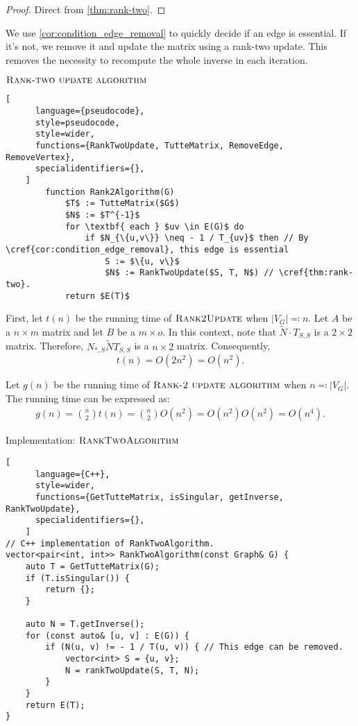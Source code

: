 \begin{proof}
    Direct from \cref{thm:rank-two}. 
\end{proof}

We use \cref{cor:condition_edge_removal} to quickly decide if an edge is essential. 
If it's not, we remove it and update the matrix using a rank-two update. 
This removes the necessity to recompute the whole inverse in each iteration.

\begin{programruledcaption}{\(\textsc{Rank-two update algorithm}\)}
    \begin{lstlisting}[
      language={pseudocode},
      style=pseudocode,
      style=wider,
      functions={RankTwoUpdate, TutteMatrix, RemoveEdge, RemoveVertex},
      specialidentifiers={},
    ]
        function Rank2Algorithm(G)
            $T$ := TutteMatrix($G$)
            $N$ := $T^{-1}$
            for \textbf{ each } $uv \in E(G)$ do
                if $N_{\{u,v\}} \neq - 1 / T_{uv}$ then // By \cref{cor:condition_edge_removal}, this edge is essential
                    S := $\{u, v\}$
                    $N$ := RankTwoUpdate($S, T, N$) // \cref{thm:rank-two}.
            return $E(T)$
    \end{lstlisting}
\end{programruledcaption}

First, let \(t(n)\) be the running time of \(\textsc{Rank2Update}\) when \(|V_G| \eqcolon n\).
Let \(A\) be a \(n \times m\) matrix and let \(B\) be a \(m \times o\).
In this context, note that \(\tilde{N} \cdot T_{S, S}\) is a \(2 \times 2\) matrix.
Therefore, \(N_{*, S}\tilde{N}T_{S, S}\) is a \(n \times 2\) matrix.
Consequently,
\[
    t(n) = O(2n^2) = O(n^2).
\]

Let \(g(n)\) be the running time of \(\textsc{Rank-2 update algorithm}\) when \(n \eqcolon |V_G|\).
The running time can be expressed as:
\begin{align*}
    g(n) = \binom{n}{2} t(n) = \binom{n}{2} O(n^2) = O(n^2) O(n^2) = O(n^4).
\end{align*}

\begin{programruledcaption}{Implementation: \(\textsc{RankTwoAlgorithm}\)}
    \begin{lstlisting}[
      language={C++},
      style=wider,
      functions={GetTutteMatrix, isSingular, getInverse, RankTwoUpdate},
      specialidentifiers={},
    ]
// C++ implementation of RankTwoAlgorithm.
vector<pair<int, int>> RankTwoAlgorithm(const Graph& G) {
    auto T = GetTutteMatrix(G);
    if (T.isSingular()) {
        return {};
    } 

    auto N = T.getInverse();
    for (const auto& [u, v] : E(G)) {
        if (N(u, v) != - 1 / T(u, v)) { // This edge can be removed.
            vector<int> S = {u, v};
            N = rankTwoUpdate(S, T, N);
        }
    }
    return E(T);
}
    \end{lstlisting}
\end{programruledcaption}